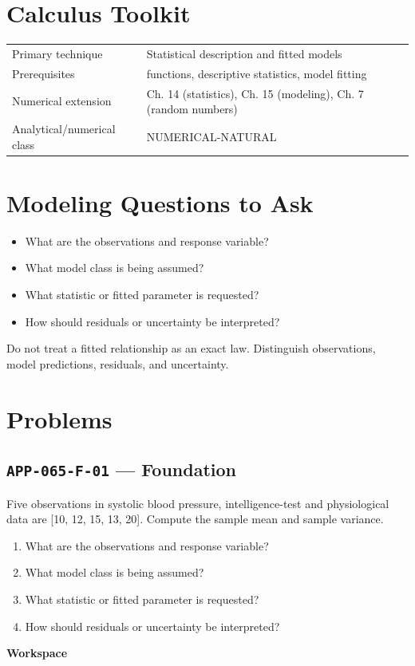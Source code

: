\documentclass[11pt]{book}
\newcommand{\pid}[1]{\texttt{#1}}
\newcommand{\workspace}{\par\vspace{0.7in}\hrulefill\par\vspace{0.55in}\hrulefill\par}
\begin{document}
\section*{Calculus Toolkit}
\begin{tabularx}{\textwidth}{@{}lX@{}}\toprule
Primary technique & Statistical description and fitted models \\
Prerequisites & functions, descriptive statistics, model fitting \\
Numerical extension & Ch. 14 (statistics), Ch. 15 (modeling), Ch. 7 (random numbers) \\
Analytical/numerical class & NUMERICAL-NATURAL \\
\bottomrule\end{tabularx}
\section*{Modeling Questions to Ask}\begin{itemize}
\item What are the observations and response variable?
\item What model class is being assumed?
\item What statistic or fitted parameter is requested?
\item How should residuals or uncertainty be interpreted?
\end{itemize}
\begin{errorbox}Do not treat a fitted relationship as an exact law. Distinguish observations, model predictions, residuals, and uncertainty.\end{errorbox}
\section*{Problems}
\subsection*{\pid{APP-065-F-01} — Foundation}
\begin{problembox}
Five observations in systolic blood pressure, intelligence-test and physiological data are [10, 12, 15, 13, 20]. Compute the sample mean and sample variance.
\end{problembox}
\begin{promptbox}\begin{enumerate}
\item What are the observations and response variable?
\item What model class is being assumed?
\item What statistic or fitted parameter is requested?
\item How should residuals or uncertainty be interpreted?
\end{enumerate}\end{promptbox}
\textbf{Workspace}\workspace
{}
\end{document}
